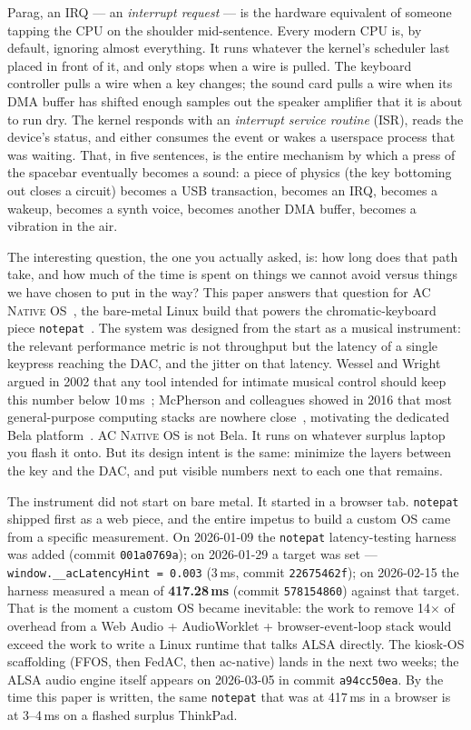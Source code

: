 \documentclass[10pt,letterpaper,twocolumn]{article}
\newcommand{\acos}{\textsc{AC Native OS}}
\begin{document}
Parag, an IRQ --- an \emph{interrupt request} --- is the hardware equivalent of someone tapping the CPU on the shoulder mid-sentence. Every modern CPU is, by default, ignoring almost everything. It runs whatever the kernel's scheduler last placed in front of it, and only stops when a wire is pulled. The keyboard controller pulls a wire when a key changes; the sound card pulls a wire when its DMA buffer has shifted enough samples out the speaker amplifier that it is about to run dry. The kernel responds with an \emph{interrupt service routine} (ISR), reads the device's status, and either consumes the event or wakes a userspace process that was waiting. That, in five sentences, is the entire mechanism by which a press of the spacebar eventually becomes a sound: a piece of physics (the key bottoming out closes a circuit) becomes a USB transaction, becomes an IRQ, becomes a wakeup, becomes a synth voice, becomes another DMA buffer, becomes a vibration in the air.

The interesting question, the one you actually asked, is: how long does that path take, and how much of the time is spent on things we cannot avoid versus things we have chosen to put in the way? This paper answers that question for \acos{}~\citep{scudder2026os}, the bare-metal Linux build that powers the chromatic-keyboard piece \texttt{notepat}~\citep{scudder2026notepat}. The system was designed from the start as a musical instrument: the relevant performance metric is not throughput but the latency of a single keypress reaching the DAC, and the jitter on that latency. Wessel and Wright argued in 2002 that any tool intended for intimate musical control should keep this number below 10\,ms~\citep{wessel2002problems}; McPherson and colleagues showed in 2016 that most general-purpose computing stacks are nowhere close~\citep{mcpherson2016action}, motivating the dedicated Bela platform~\citep{jack2018sub,bela}. \acos{} is not Bela. It runs on whatever surplus laptop you flash it onto. But its design intent is the same: minimize the layers between the key and the DAC, and put visible numbers next to each one that remains.

The instrument did not start on bare metal. It started in a browser tab. \texttt{notepat} shipped first as a web piece, and the entire impetus to build a custom OS came from a specific measurement. On 2026-01-09 the \texttt{notepat} latency-testing harness was added (commit \texttt{001a0769a}); on 2026-01-29 a target was set --- \texttt{window.\_\_acLatencyHint = 0.003} (3\,ms, commit \texttt{22675462f}); on 2026-02-15 the harness measured a mean of \textbf{417.28\,ms} (commit \texttt{578154860}) against that target. That is the moment a custom OS became inevitable: the work to remove 14$\times$ of overhead from a Web Audio + AudioWorklet + browser-event-loop stack would exceed the work to write a Linux runtime that talks ALSA directly. The kiosk-OS scaffolding (FFOS, then FedAC, then ac-native) lands in the next two weeks; the ALSA audio engine itself appears on 2026-03-05 in commit \texttt{a94cc50ea}. By the time this paper is written, the same \texttt{notepat} that was at 417\,ms in a browser is at 3--4\,ms on a flashed surplus ThinkPad.
\end{document}
